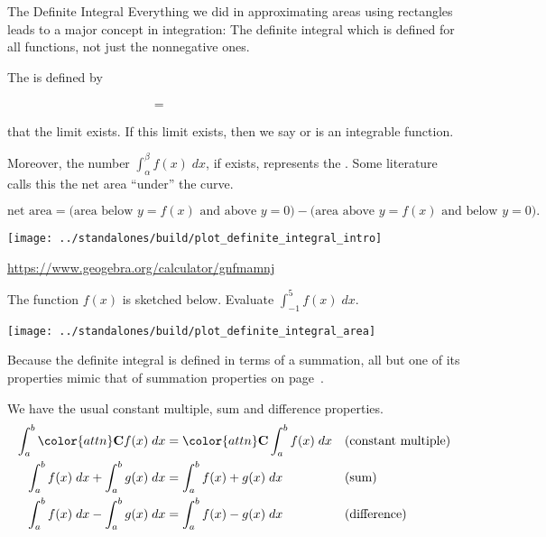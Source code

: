 \documentclass[../main.tex]{subfiles}
\begin{document}
\begin{lesson}{The Definite Integral}
  Everything we did in approximating areas using rectangles leads to a major concept in integration: The definite integral which is defined for all functions, not just the nonnegative ones.
  \begin{mdframed}[style=withref-compact]
    The  is defined by 
    \begin{equation} \label{eq:definite-integral} 
      \phantom{\int_{\alpha}^{\beta} f(x) \;dx} = \hspace{3in}
    \end{equation}
     that the limit exists. If this limit exists, then we say  or is an integrable function. 

    Moreover, the number \(\int_{\alpha}^{\beta} f(x) \;dx\), if exists, represents the  . Some literature calls this the net area ``under'' the curve.
  \end{mdframed}
  \[
    \text{net area} = \bigg(\text{area below \(y = f(x)\) and above \(y = 0\)}\bigg) - \bigg(\text{area above \(y = f(x)\) and below \(y = 0\)}\bigg).
  \]
  
  \texttt{[image: ../standalones/build/plot\_definite\_integral\_intro]}

  \url{https://www.geogebra.org/calculator/gnfmamnj}
  
  \begin{example} \label{ex:definite-integral-area}
    The function \(f(x)\) is sketched below. Evaluate \(\int_{-1}^{5} f(x) \;dx\).

    \texttt{[image: ../standalones/build/plot\_definite\_integral\_area]}
  \end{example}
  \clearpage

  Because the definite integral is defined in terms of a summation, all but one of its properties mimic that of summation properties on page~\pageref{page:summation-properties}.

  We have the usual constant multiple, sum and difference properties.
  \begin{align*}
    \int_{a}^{b} {\color{attn} \mathbf{C}} f(x) \;dx &= {\color{attn} \mathbf{C}} \int_{a}^{b} f(x) \;dx && \text{(constant multiple)}\\
    \int_{a}^{b} f(x) \;dx + \int_{a}^{b} g(x) \;dx &= \int_{a}^{b} f(x) + g(x) \;dx && \text{(sum)} \\
    \int_{a}^{b} f(x) \;dx - \int_{a}^{b} g(x) \;dx &= \int_{a}^{b} f(x) - g(x) \;dx && \text{(difference)}
  \end{align*}
    

\end{lesson}
\end{document}
